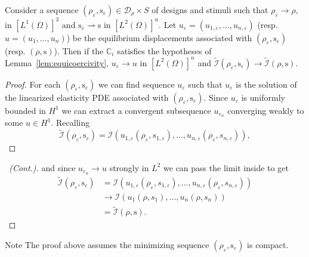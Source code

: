 \documentclass{beamer}
\newcommand{\p}{\rho}
\newcommand{\e}{\varepsilon}
\newcommand{\OO}{\Omega}
\begin{document}
\begin{frame}
    \begin{theorem}
        Consider a sequence $(\p_\e,\mathrm{s}_\e) \in \mathcal{D}_\p \times S$ of designs and stimuli 
        such that $\p_\e \to \p,$ in $\left[L^1(\Omega)\right]^3$ 
        and $\mathrm{s}_\e \rightharpoonup \mathrm{s}$ 
        in  $\left[L^2(\Omega)\right]^n$. Let $u_\e = (u_{1,\e},\dots,u_{n,\e})$ 
        (resp. $u = (u_1,\dots,u_n)$) be the equilibrium displacements associated 
        with $(\p_\e,\mathrm{s}_\e)$ (resp. $(\p,\mathrm{s})$).
        Then if the $\mathbb{C}_i$ satisfies the hypotheses of Lemma~\ref{lem:equicoercivity}, $u_\e \to u$ in $\left[L^2(\OO)\right]^n$
        and $\widetilde{\mathcal{I}}(\rho_{\e},\mathrm{s}_{\e}) \longrightarrow \widetilde{\mathcal{I}}(\rho,\mathrm{s}).$
        \end{theorem}
    \begin{proof}
        For each $(\p_{\e},\mathrm{s}_{\e})$ we can find sequence $u_{\e}$ 
        such that $u_{\e}$ is the solution of the linearized elasticity PDE 
        associated with $(\p_{\e},\mathrm{s}_{\e}).$ Since $u_{\e}$ is uniformly bounded 
        in $H^1$ we can extract a convergent subsequence $u_{{\e}_n}$ converging 
        weakly to some $u \in H^1.$  
        Recalling
        $$\widetilde{\mathcal{I}}(\rho_{\e},\mathrm{s}_{\e}) = \mathcal{I}\left(u_{1,\e}(\rho_{\e},s_{1,\e}), \dots, u_{n,\e}(\rho_{\e},s_{n,\e})\right),$$
        
    \end{proof}
\end{frame}

\begin{frame}
    \begin{proof}[\proofname\ (Cont.)]
        and since $u_{{\e}_n} \rightarrow u$ strongly in $L^2$ we can pass the limit inside to get
        \begin{align*}
            \widetilde{\mathcal{I}}(\rho_{\e},\mathrm{s}_{\e}) &= \mathcal{I}\left(u_{1,\e}(\rho_{\e},s_{1,\e}), \dots, u_{n,\e}(\rho_{\e},s_{n,\e})\right)\\
            &\rightarrow \mathcal{I}\left(u_{1}(\rho,s_{1}), \dots, u_{n}(\rho,s_{n})\right)\\
            &= \widetilde{\mathcal{I}}(\rho,\mathrm{s}).
        \end{align*}
    \end{proof}
    \begin{block}{Note}
        The proof above assumes the minimizing sequence $(\p_{\varepsilon}, \mathrm{s}_{\varepsilon})$ is compact.
    \end{block}
\end{frame}
\end{document}
